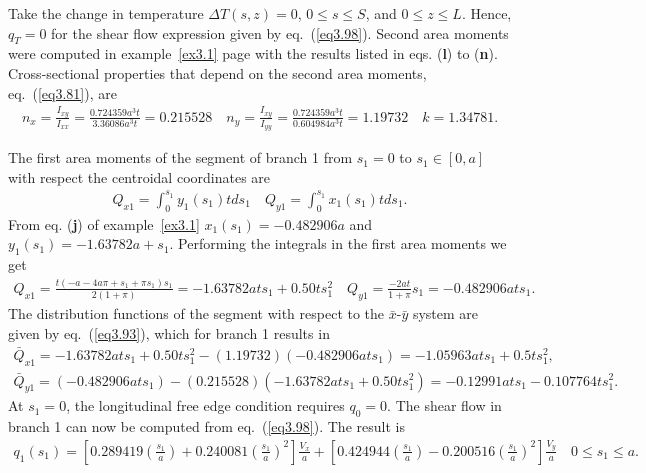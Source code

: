 \documentclass{AeroStructure-ERJohnson}
\begin{document}
\vspace*{-1.4pc}

\begin{example}\label{ex3.2}\setcounter{equation}{0}\def\theequation{\alph{equation}}Take the change in temperature $\Delta T(s, z)=0$, $0 \leq s \leq S$, and $0 \leq z \leq L$. Hence, $q_{T}=0$ for the shear flow expression given by eq.~(\ref{eq3.98}). Second area moments were computed in example~\ref{ex3.1} page \pageref{ex3.1} with the results listed in eqs. (\textbf{l}) to (\textbf{n}). Cross-sectional properties that depend on the second area moments, eq.~(\ref{eq3.81}), are
\begin{align}\label{ex3.2a}
n_{x}=\frac{I_{x y}}{I_{x x}}=\frac{0.724359 a^{3} t}{3.36086 a^{3} t}=0.215528 \quad n_{y}=\frac{I_{x y}}{I_{y y}}=\frac{0.724359 a^{3} t}{0.604984 a^{3} t}=1.19732 \quad k=1.34781.
\end{align}

The first area moments of the segment of branch 1 from $s_{1}=0$ to $s_{1} \in[0, a]$ with respect the centroidal coordinates are
\begin{align}\label{ex3.2b}
Q_{x 1}=\int_{0}^{s_{1}} y_{1}\left(s_{1}\right) t d s_{1} \quad Q_{y 1}=\int_{0}^{s_{1}} x_{1}\left(s_{1}\right) t d s_{1}.
\end{align}
From eq. (\textbf{j}) of example~\ref{ex3.1} $x_{1}\left(s_{1}\right)=-0.482906 a$ and $y_{1}\left(s_{1}\right)=-1.63782 a+s_{1}$. Performing the integrals in the first area moments we get
\begin{align}\label{ex3.2c}
Q_{x 1}=\frac{t\left(-a-4 a \pi+s_{1}+\pi s_{1}\right) s_{1}}{2(1+\pi)}=-1.63782 a t s_{1}+0.50 t s_{1}^{2} \quad Q_{y 1}=\frac{-2 a t}{1+\pi} s_{1}=-0.482906 a t s_{1}.
\end{align}
The distribution functions of the segment with respect to the $\bar{x}$-$\bar{y}$ system are given by eq.~(\ref{eq3.93}), which for branch 1 results in
\begin{gather}
\bar{Q}_{x 1}=-1.63782 a t s_{1}+0.50 t s_{1}^{2}-(1.19732)\left(-0.482906 a t s_{1}\right)=-1.05963 a t s_{1}+0.5 t s_{1}^{2},\label{ex3.2d} \tag{d}\\
\bar{Q}_{y 1}=(-0.482906 a t s_{1})-(0.215528)(-1.63782 a t s_{1}+0.50 t s_{1}^{2})=-0.12991 a t s_{1}-0.107764 t s_{1}^{2}.\label{ex3.2e} \tag{e}
\end{gather}
At $s_1 = 0$, the longitudinal free edge condition requires $q_0 = 0$. The shear flow in branch 1 can now be computed from eq.~(\ref{eq3.98}). The result is
\begin{align}\label{ex3.2f}
q_{1}\left(s_{1}\right)=\left[0.289419\left(\frac{s_{1}}{a}\right)+0.240081\left(\frac{s_{1}}{a}\right)^{2}\right] \frac{V_{x}}{a}+\left[0.424944\left(\frac{s_{1}}{a}\right)-0.200516\left(\frac{s_{1}}{a}\right)^{2}\right] \frac{V_{y}}{a} \quad 0 \leq s_{1} \leq a. \tag{f}
\end{align}


\end{example}
\end{document}
